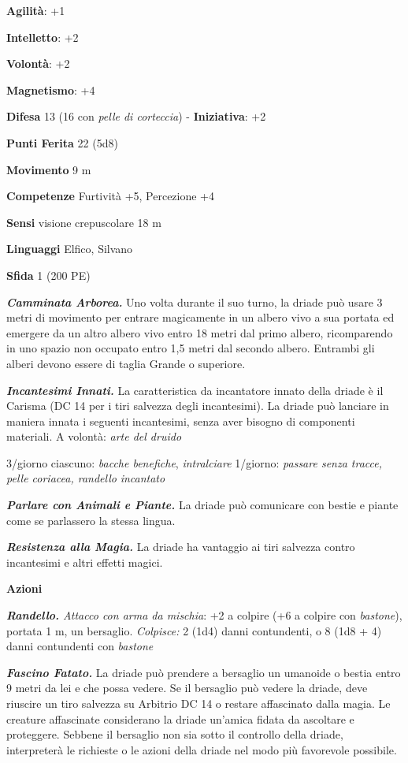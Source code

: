 \begin{multicols}{2}
\textbf{Agilità}: +1

\textbf{Intelletto}: +2

\textbf{Volontà}: +2

\textbf{Magnetismo}: +4

\textbf{Difesa} 13 (16 con \emph{pelle di corteccia}) - \textbf{Iniziativa}: +2

\textbf{Punti Ferita} 22 (5d8)

\textbf{Movimento} 9 m

\textbf{Competenze} Furtività +5, Percezione +4

\textbf{Sensi} visione crepuscolare 18 m

\textbf{Linguaggi} Elfico, Silvano

\textbf{Sfida} 1 (200 PE)\smallskip

\emph{\textbf{Camminata Arborea.}} Uno volta durante il suo turno, la
driade può usare 3 metri di movimento per entrare magicamente in un
albero vivo a sua portata ed emergere da un altro albero vivo entro 18
metri dal primo albero, ricomparendo in uno spazio non occupato entro
1,5 metri dal secondo albero. Entrambi gli alberi devono essere di
taglia Grande o superiore.

\emph{\textbf{Incantesimi Innati.}} La caratteristica da incantatore
innato della driade è il Carisma (DC 14 per i tiri salvezza degli
incantesimi). La driade può lanciare in maniera innata i seguenti
incantesimi, senza aver bisogno di componenti materiali. A volontà:
\emph{arte del druido}

3/giorno ciascuno: \emph{bacche benefiche}, \emph{intralciare} 1/giorno:
\emph{passare senza tracce, pelle coriacea, randello} \emph{incantato}

\emph{\textbf{Parlare con Animali e Piante.}} La driade può comunicare
con bestie e piante come se parlassero la stessa lingua.

\emph{\textbf{Resistenza alla Magia.}} La driade ha vantaggio ai tiri
salvezza contro incantesimi e altri effetti magici.

\smallskip\textbf{Azioni}

\emph{\textbf{Randello.} Attacco con arma da mischia}: +2 a colpire (+6
a colpire con \emph{bastone}), portata 1 m, un bersaglio.
\emph{Colpisce:} 2 (1d4) danni contundenti, o 8 (1d8 + 4) danni
contundenti con \emph{bastone}

\emph{\textbf{Fascino Fatato.}} La driade può prendere a bersaglio un
umanoide o bestia entro 9 metri da lei e che possa vedere. Se il
bersaglio può vedere la driade, deve riuscire un tiro salvezza su Arbitrio DC 14 o restare affascinato dalla magia. Le creature
affascinate considerano la driade un'amica fidata da ascoltare e
proteggere. Sebbene il bersaglio non sia sotto il controllo della
driade, interpreterà le richieste o le azioni della driade nel modo più
favorevole possibile.


\end{multicols}
